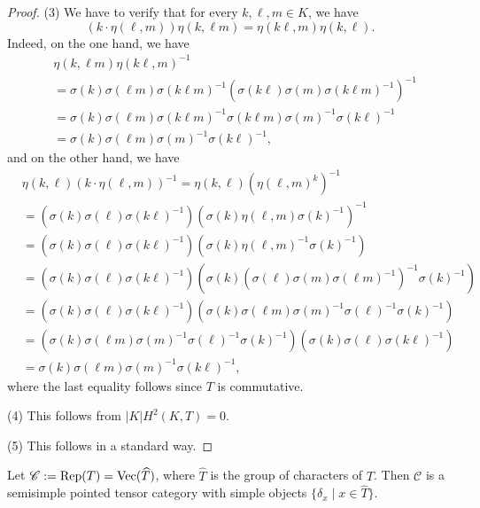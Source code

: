 \documentclass{amsart}
\theoremstyle{definition}
\newcommand{\Vect}{{\rm Vec}}
\newcommand{\C}{\mathscr{C}}
\numberwithin{equation}{section}
\begin{document}
\begin{proof}
(3) We have to verify that for every $k,\ell,m\in K$, we have
$$(k\cdot \eta(\ell,m))\eta(k,\ell m)=\eta(k\ell,m)\eta(k,\ell).$$
Indeed, on the one hand, we have
\begin{equation*}
\begin{split}
& \eta(k,\ell m)\eta(k\ell,m)^{-1}\\
& = \sigma(k)\sigma(\ell m)\sigma(k\ell m)^{-1}(\sigma(k\ell)\sigma(m)\sigma(k\ell m)^{-1})^{-1}\\
& = \sigma(k)\sigma(\ell m)\sigma(k\ell m)^{-1}\sigma(k\ell m)\sigma(m)^{-1}\sigma(k\ell)^{-1}\\
& = \sigma(k)\sigma(\ell m)\sigma(m)^{-1}\sigma(k\ell)^{-1},
\end{split}
\end{equation*}
and on the other hand, we have
\begin{equation*}
\begin{split}
& \eta(k,\ell)(k\cdot \eta(\ell,m))^{-1}=\eta(k,\ell)(\eta(\ell,m)^k)^{-1}\\
& = \left(\sigma(k)\sigma(\ell)\sigma(k\ell)^{-1}\right)\left(\sigma(k)\eta(\ell,m)\sigma(k)^{-1}\right)^{-1}\\
& = \left(\sigma(k)\sigma(\ell)\sigma(k\ell)^{-1}\right)\left(\sigma(k)\eta(\ell,m)^{-1}\sigma(k)^{-1}\right)\\
& = \left(\sigma(k)\sigma(\ell)\sigma(k\ell)^{-1}\right)\left(\sigma(k)(\sigma(\ell)\sigma(m)\sigma(\ell m)^{-1})^{-1}\sigma(k)^{-1}\right)\\
& =  \left(\sigma(k)\sigma(\ell)\sigma(k\ell)^{-1}\right)\left(\sigma(k)\sigma(\ell m)\sigma(m)^{-1}\sigma(\ell)^{-1}\sigma(k)^{-1}\right)\\
& =  \left(\sigma(k)\sigma(\ell m)\sigma(m)^{-1}\sigma(\ell)^{-1}\sigma(k)^{-1}\right) \left(\sigma(k)\sigma(\ell)\sigma(k\ell)^{-1}\right)\\
& = \sigma(k)\sigma(\ell m)\sigma(m)^{-1}\sigma(k\ell)^{-1},
\end{split}
\end{equation*}
where the last equality follows since $T$ is commutative.

(4) This follows from $|K|H^2(K,T)=0$.

(5) This follows in a standard way.
\end{proof}

Let $\C:={\rm Rep}(T)=\Vect(\widehat{T})$, where $\widehat{T}$ is the group of characters of $T$. Then $\C$ is a semisimple  pointed tensor category with simple objects $\{\delta_x\mid x\in \widehat{T}\}$.
\end{document}
